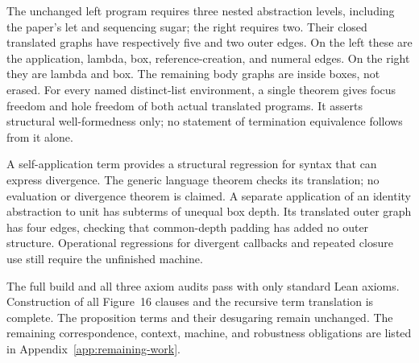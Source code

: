 
The unchanged left program requires three nested abstraction levels,
including the paper's let and sequencing sugar; the right requires two.
Their closed translated graphs have respectively five and two outer edges.
On the left these are the application, lambda, box, reference-creation,
and numeral edges. On the right they are lambda and box. The remaining
body graphs are inside boxes, not erased. For every named distinct-list
environment, a single theorem gives focus freedom and hole freedom of both
actual translated programs. It asserts structural well-formedness only;
no statement of termination equivalence follows from it alone.






A self-application term provides a structural regression for syntax that
can express divergence. The generic language theorem checks its translation;
no evaluation or divergence theorem is claimed. A separate application
of an identity abstraction to unit has subterms of unequal box depth.
Its translated outer graph has four edges, checking that common-depth
padding has added no outer structure. Operational regressions for divergent
callbacks and repeated closure use still require the unfinished machine.




The full build and all three axiom audits pass with only standard Lean
axioms. Construction of all Figure~16 clauses and the recursive term
translation is complete. The proposition terms and their desugaring remain
unchanged. The remaining correspondence, context, machine, and robustness
obligations are listed in Appendix~\ref{app:remaining-work}.
